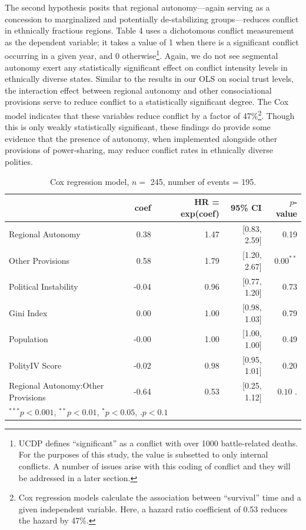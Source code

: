 \documentclass[12pt]{article}
\begin{document}
The second hypothesis posits that regional autonomy---again serving as a concession to marginalized and potentially de-stabilizing groups---reduces conflict in ethnically fractious regions. Table 4 uses a dichotomous conflict measurement as the dependent variable; it takes a value of 1 when there is a significant conflict occurring in a given year, and 0 otherwise\footnote{UCDP defines ``significant'' as a conflict with over 1000 battle-related deaths. For the purposes of this study, the value is subsetted to only internal conflicts. A number of issues arise with this coding of conflict and they will be addressed in a later section.}. Again, we do not see segmental autonomy exert any statistically significant effect on conflict intensity levels in ethnically diverse states. Similar to the results in our OLS on social trust levels, the interaction effect between regional autonomy and other consociational provisions serve to reduce conflict to a statistically significant degree. The Cox model indicates that these variables reduce conflict by a factor of 47\%\footnote{Cox regression models calculate the association between ``survival'' time and a given independent variable. Here, a hazard ratio coefficient of 0.53 reduces the hazard by 47\%.}. Though this is only weakly statistically significant, these findings do provide some evidence that the presence of autonomy, when implemented alongside other provisions of power-sharing, may reduce conflict rates in ethnically diverse polities. 

\begin{table}[!htbp]
	\centering
	\begin{tabular}{lrrrr}
		\hline
		& coef & HR = exp(coef) & 95\% CI & $p$-value \\ 
		\hline
		Regional Autonomy & 0.38 & 1.47 & [0.83, 2.59] & 0.19 \\ 
		Other Provisions & 0.58 & 1.79 & [1.20, 2.67] & $0.00^{**}$ \\ 
		Political Instability & -0.04 & 0.96 & [0.77, 1.20] & 0.73 \\ 
		Gini Index & 0.00 & 1.00 & [0.98, 1.03] & 0.79 \\ 
		Population & -0.00 & 1.00 & [1.00, 1.00] & 0.49 \\ 
		PolityIV Score & -0.02 & 0.98 & [0.95, 1.01] & 0.20 \\ 
		Regional Autonomy:Other Provisions & -0.64 & 0.53 & [0.25, 1.12] & $0.10 {\textbf{ .}}$ \\ 
		\hline
		\multicolumn{4}{l}{\scriptsize{$^{***}p<0.001$, $^{**}p<0.01$, $^*p<0.05$, $\textbf{.}p<0.1$}}
	\end{tabular}
	\caption{Cox regression model, $n = $ 245, number of events = 195.} 
	\label{mod}
\end{table}
\end{document}
